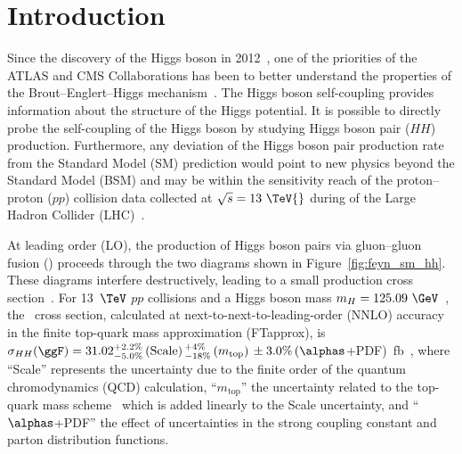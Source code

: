 \documentclass[PAPER, cernpreprint, texlive=2016, paper=a4, USenglish, texmf]{atlasdoc}
\author{The ATLAS Collaboration}
\begin{document}
 
\maketitle
 
\tableofcontents
 
 
 
 
\section{Introduction}
\label{sec:intro} 
 
Since the discovery of the Higgs boson in 2012~\cite{HIGG-2012-27,CMS-HIG-12-028}, one of the priorities of the ATLAS and CMS Collaborations has been to better understand the properties of the Brout--Englert--Higgs mechanism~\cite{Englert:1964et,Higgs:1964ia,Higgs:1964pj,Guralnik:1964eu,Higgs:1966ev,Kibble:1967sv}. The Higgs boson self-coupling provides information about the structure of the Higgs potential. 
It is possible to directly probe the self-coupling of the Higgs boson by studying Higgs boson pair ($HH$) production. Furthermore, any deviation of
the Higgs boson pair production rate from the Standard Model (SM) prediction would point to new physics beyond the Standard Model (BSM) and may be within the sensitivity reach of the proton--proton ($pp$) collision data collected at $\sqrt{s} = 13~\TeV{}$ during  \RunTwo{} of the Large Hadron Collider (LHC)~\cite{Huang:2016cjm}.
 
At leading order (LO), the production of Higgs boson pairs via gluon--gluon fusion (\ggF) proceeds through the two diagrams shown in Figure~\ref{fig:feyn_sm_hh}. These diagrams interfere destructively, leading to a small production cross section~\cite{Dawson:1998py,Borowka:2016ehy,deFlorian:2013jea}. For 13~$\TeV$ $pp$ collisions and a Higgs boson mass $m_{H}=125.09~\GeV$~\cite{HIGG-2014-14}, the \ggF\ cross section, calculated at next-to-next-to-leading-order (NNLO) accuracy in the finite top-quark mass approximation (FTapprox), is
$\sigma_{HH}(\ggF) = 31.02^{+2.2\%}_{-5.0\%}\,\text{(Scale)}\,^{+4\%}_{-18\%}\,(m_{\text{top}})\,\pm 3.0\%\,(\alphas$+PDF)~fb~\cite{DiMicco:2019ngk,Shao:2013bz,deFlorian:2015moa,Baglio:2020wgt}, where ``Scale'' represents the uncertainty due to the finite order of the quantum chromodynamics (QCD) calculation, ``$m_{\textrm{top}}$'' the uncertainty related to the top-quark mass scheme~\cite{Baglio:2020wgt,Grazzini:2018bsd} which is added linearly to the Scale uncertainty, and ``$\alphas$+PDF'' the effect of uncertainties in the strong coupling constant and parton distribution functions.
 
\end{document}
